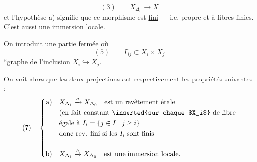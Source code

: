 \[
(3)\qquad X_{\Delta_0}\longrightarrow X
\]
et l'hypothèse a) signifie que ce
morphisme  est \uline{fini} --- i.e. propre
 et à fibres finies. C'est aussi une
\uline{immersion locale}.

On introduit une partie fermée
où
\[
(5)\qquad \Gamma_{ij}\subset X_i\times X_j
\]
``graphe de l'inclusion $X_i\hookrightarrow X_j$.

On voit alors que les deux projections
ont respectivement les propriétés suivantes :
\[
(7)\quad\left\{\begin{aligned}
\text{a)}\quad &X_{\Delta_1}\xrightarrow{a}X_{\Delta_0}\quad\text{est un revêtement étale}\\
&\text{(en fait constant \inserted{sur chaque $X_i$} de fibre}\\
&\text{égale à }I_i=\{j\in I\mid j\geq i\}\\
&\text{donc rev. fini si les }I_i\text{ sont finis}\\[1em]
\text{b)}\quad &X_{\Delta_1}\xrightarrow{b}X_{\Delta_0}\quad\text{est une immersion locale.}
\end{aligned}\right.
\]
